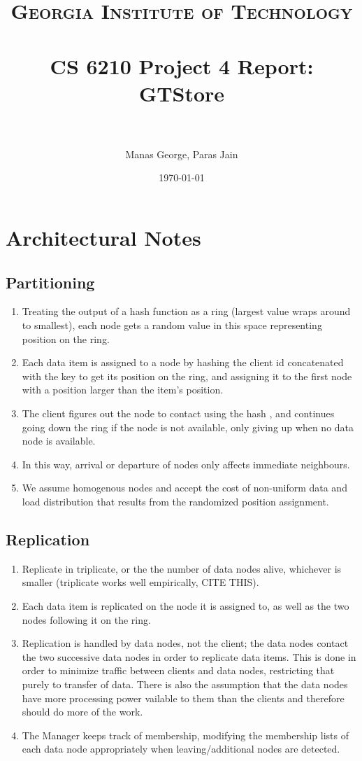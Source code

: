 \documentclass[paper=a4,fontsize=11pt]{report} %
\title{	
\normalfont \normalsize 
\textsc{Georgia Institute of Technology} \\ [25pt] %
\horrule{0.5pt} \\[0.4cm] %
\huge CS 6210 Project 4 Report: GTStore \\ %
\horrule{2pt} \\[0.5cm] %
}
\author{Manas George, Paras Jain} %
\date{\normalsize\today} %
\numberwithin{equation}{section} %
\numberwithin{figure}{section} %
\numberwithin{table}{section} %
\begin{document}
\maketitle %

\section{Architectural Notes}

\subsection{Partitioning}
\begin{enumerate}
\item Treating the output of a hash function as a ring (largest value wraps around to smallest), each node gets a random value in this space representing position on the ring.
\item Each data item is assigned to a node by hashing the client id concatenated with the key to get its position on the ring, and assigning it to the first node with a position larger than the item's position.
\item The client figures out the node to contact using the hash , and continues going down the ring if the node is not available, only giving up when no data node is available.
\item In this way, arrival or departure of nodes only affects immediate neighbours.
\item We assume homogenous nodes and accept the cost of non-uniform data and load distribution that results from the randomized position assignment.
\end{enumerate}

\subsection{Replication}
\begin{enumerate}
\item Replicate in triplicate, or the the number of data nodes alive, whichever is smaller (triplicate works well empirically, CITE THIS).
\item Each data item is replicated on the node it is assigned to, as well as the two nodes following it on the ring.
\item Replication is handled by data nodes, not the client; the data nodes contact the two successive data nodes in order to replicate data items. This is done in order to minimize traffic between clients and data nodes, restricting that purely to transfer of data. There is also the assumption that the data nodes have more processing power vailable to them than the clients and therefore should do more of the work.
\item The Manager keeps track of membership, modifying the membership lists of each data node appropriately when leaving/additional nodes are detected.
\end{enumerate}
\end{document}
